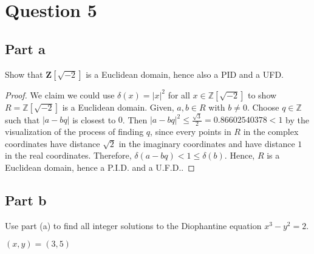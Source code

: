\section{Question 5}

\subsection{Part a}

\begin{question}
    Show that $\mathbf{Z}[\sqrt{-2}]$ is a Euclidean domain, hence also a PID and a UFD.
\end{question}

\begin{answer}
    \begin{proof}
        We claim we could use $\delta(x) = \lvert x \rvert^2$ for all $x \in \mathbb{Z}[\sqrt{-2}]$ to show $R = \mathbb{Z}[\sqrt{-2}]$ is a Euclidean domain. Given, $a,b \in R$ with $b \neq 0$. Choose $q \in \mathbb{Z}$ such that $\lvert a - bq \rvert$ is closest to $0$. Then $\lvert a - bq \rvert^2 \leq \tfrac{\sqrt{3}}{2} = 0.86602540378 < 1$ by the visualization of the process of finding $q$, since every points in $R$ in the complex coordinates have distance $\sqrt{2}$ in the imaginary coordinates and have distance $1$ in the real coordinates. Therefore, $\delta(a-bq) < 1 \leq \delta(b)$. Hence, $R$ is a Euclidean domain, hence a P.I.D. and a U.F.D..
    \end{proof}    
\end{answer}

\subsection{Part b}

\begin{question}
    Use part (a) to find all integer solutions to the Diophantine equation $x^3-y^2=2$.
\end{question}

\begin{answer}
    $(x,y) = (3,5)$
\end{answer}